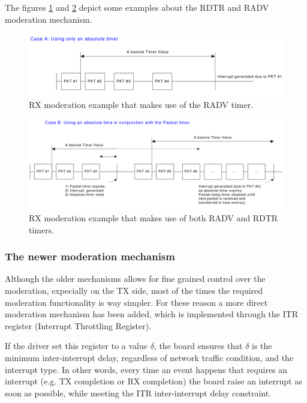 The figures \ref{fig:radvonly} and \ref{fig:rdtrradv} depict some examples about the RDTR and RADV moderation mechanism.

\begin{figure}[bt]
\centering
\includegraphics[scale = 0.45]{radv-only.png}
\caption{RX moderation example that makes use of the RADV timer.}
\label{fig:radvonly}
\end{figure}

\begin{figure}[bt]
\centering
\includegraphics[scale = 0.45]{rdtr-radv.png}
\caption{RX moderation example that makes use of both RADV and RDTR timers.}
\label{fig:rdtrradv}
\end{figure}


\subsubsection{The newer moderation mechanism}
Although the older mechanisms allows for fine grained control over the moderation, expecially on the TX side, most of the times the 
required moderation functionality is way simpler. For these reason a more direct moderation mechanism has been added, which is implemented
through the ITR register (Interrupt Throttling Register).

If the driver set this register to a value $\delta$, the board ensures that $\delta$ is the minimum inter-interrupt delay, regardless of
network traffic condition, and the interrupt type.
In other words, every time an event happens that requires an interrupt (e.g. TX completion or RX completion) the board raise an interrupt
as soon as possible, while meeting the ITR inter-interrupt delay constraint.

